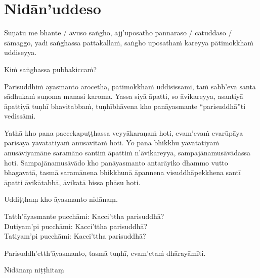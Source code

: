\section{Nidān'uddeso}
\label{nidan'uddeso}

Suṇātu me bhante / āvuso saṅgho, ajj'uposatho pannaraso / cātuddaso / sāmaggo, yadi saṅghassa pattakallaṁ, saṅgho uposathaṁ kareyya pātimokkhaṁ uddiseyya.

Kiṁ saṅghassa pubbakiccaṁ?

Pārisuddhiṁ āyasmanto ārocetha, pātimokkhaṁ uddisissāmi, taṁ sabb'eva santā sādhukaṁ suṇoma manasi karoma. Yassa siyā āpatti, so āvikareyya, asantiyā āpattiyā tuṇhī bhavitabbaṁ, tuṇhībhāvena kho panāyasmante “parisuddhā”ti vedissāmi.

Yathā kho pana paccekapuṭṭhassa veyyākaraṇaṁ hoti, evam'evaṁ evarūpāya parisāya yāvatatiyaṁ anusāvitaṁ hoti. Yo pana bhikkhu yāvatatiyaṁ anusāviyamāne saramāno santiṁ āpattiṁ n'āvikareyya, sampajānamusāvādassa hoti. Sampajānamusāvādo kho panāyasmanto antarāyiko dhammo vutto bhagavatā, tasmā saramānena bhikkhunā āpannena visuddhāpekkhena santī āpatti āvikātabbā, āvikatā hissa phāsu hoti.

\medskip

\begin{center}
Uddiṭṭhaṃ kho āyasmanto nidānaṃ.

\smallskip

Tatth'āyasmante pucchāmi: Kacci'ttha parisuddhā?\\
Dutiyam'pi pucchāmi: Kacci'ttha parisuddhā?\\
Tatiyam'pi pucchāmi: Kacci'ttha parisuddhā?

\smallskip

Parisuddh'etth'āyasmanto, tasmā tuṇhī, evam'etaṁ dhārayāmīti.
\end{center}

\begin{outro}
  Nidānaṃ niṭṭhitaṃ
\end{outro}

\clearpage
